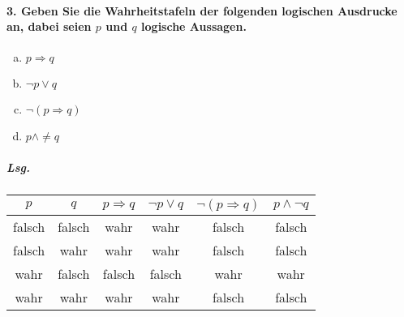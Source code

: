 \documentclass{scrreprt}
\begin{document}
\newpage
\paragraph{3. Geben Sie die Wahrheitstafeln der folgenden logischen Ausdrucke
  an, dabei seien $p$ und $q$ logische Aussagen.}

\begin{center}
  \begin{multicols}{4}
    \begin{enumerate}[a)]
    \item $p \Rightarrow q$
    \item $\neg p \lor q$
    \item $\neg (p \Rightarrow q)$
    \item $p \land \neq q$
    \end{enumerate}
  \end{multicols}
\end{center}

\subparagraph{Lsg.}

\begin{center}
  \begin{tabular}{c | c | c | c | c | c}
    $p$ & $q$ & $p \Rightarrow q$ & $\neg p \lor q$ & $\neg (p \Rightarrow q)$ & $p \land \neg q$ \\
    \hline
    falsch & falsch & wahr & wahr & falsch & falsch  \\
    falsch & wahr & wahr & wahr & falsch & falsch \\
    wahr & falsch & falsch & falsch & wahr & wahr \\
    wahr & wahr & wahr & wahr & falsch & falsch
  \end{tabular}
\end{center}
\end{document}
